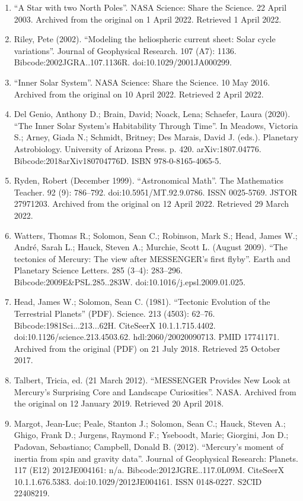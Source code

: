 \begin{enumerate}
\item ``A Star with two North Poles''. NASA Science: Share the Science. 22 April 2003. Archived from the original on 1 April 2022. Retrieved 1 April 2022.
\item Riley, Pete (2002). ``Modeling the heliospheric current sheet: Solar cycle variations''. Journal of Geophysical Research. 107 (A7): 1136. Bibcode:2002JGRA..107.1136R. doi:10.1029/2001JA000299.
\item ``Inner Solar System''. NASA Science: Share the Science. 10 May 2016. Archived from the original on 10 April 2022. Retrieved 2 April 2022.
\item Del Genio, Anthony D.; Brain, David; Noack, Lena; Schaefer, Laura (2020). ``The Inner Solar System's Habitability Through Time''. In Meadows, Victoria S.; Arney, Giada N.; Schmidt, Britney; Des Marais, David J. (eds.). Planetary Astrobiology. University of Arizona Press. p. 420. arXiv:1807.04776. Bibcode:2018arXiv180704776D. ISBN 978-0-8165-4065-5.
\item Ryden, Robert (December 1999). ``Astronomical Math''. The Mathematics Teacher. 92 (9): 786–792. doi:10.5951/MT.92.9.0786. ISSN 0025-5769. JSTOR 27971203. Archived from the original on 12 April 2022. Retrieved 29 March 2022.
\item Watters, Thomas R.; Solomon, Sean C.; Robinson, Mark S.; Head, James W.; André, Sarah L.; Hauck, Steven A.; Murchie, Scott L. (August 2009). ``The tectonics of Mercury: The view after MESSENGER's first flyby''. Earth and Planetary Science Letters. 285 (3–4): 283–296. Bibcode:2009E\&PSL.285..283W. doi:10.1016/j.epsl.2009.01.025.
\item Head, James W.; Solomon, Sean C. (1981). ``Tectonic Evolution of the Terrestrial Planets'' (PDF). Science. 213 (4503): 62–76. Bibcode:1981Sci...213...62H. CiteSeerX 10.1.1.715.4402. doi:10.1126/science.213.4503.62. hdl:2060/20020090713. PMID 17741171. Archived from the original (PDF) on 21 July 2018. Retrieved 25 October 2017.
\item Talbert, Tricia, ed. (21 March 2012). ``MESSENGER Provides New Look at Mercury's Surprising Core and Landscape Curiosities''. NASA. Archived from the original on 12 January 2019. Retrieved 20 April 2018.
\item Margot, Jean-Luc; Peale, Stanton J.; Solomon, Sean C.; Hauck, Steven A.; Ghigo, Frank D.; Jurgens, Raymond F.; Yseboodt, Marie; Giorgini, Jon D.; Padovan, Sebastiano; Campbell, Donald B. (2012). ``Mercury's moment of inertia from spin and gravity data''. Journal of Geophysical Research: Planets. 117 (E12) 2012JE004161: n/a. Bibcode:2012JGRE..117.0L09M. CiteSeerX 10.1.1.676.5383. doi:10.1029/2012JE004161. ISSN 0148-0227. S2CID 22408219.

\end{enumerate}
